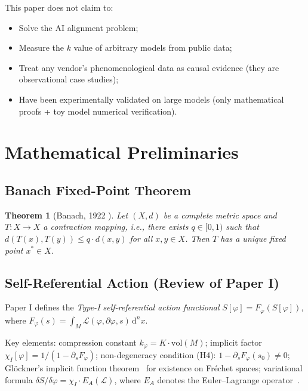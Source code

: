 \documentclass[12pt,a4paper]{article}
\newtheorem{theorem}{Theorem}[section]
\theoremstyle{definition}
\newcommand{\mL}{\mathcal{L}}
\newcommand{\vol}{\mathrm{vol}}
\newcommand{\diff}{\mathrm{d}}
\newcommand{\chiI}{\chi_I}
\newcommand{\EA}{E_A}
\newcommand{\dVol}{\,\diff^n x}
\begin{document}
This paper does not claim to:
\begin{itemize}[leftmargin=*]
\item Solve the AI alignment problem;
\item Measure the $k$ value of arbitrary models from public data;
\item Treat any vendor's phenomenological data as causal evidence (they are observational case studies);
\item Have been experimentally validated on large models (only mathematical proofs + toy model numerical verification).
\end{itemize}

\section{Mathematical Preliminaries}
\label{sec:prelim}

\subsection{Banach Fixed-Point Theorem}

\begin{theorem}[Banach, 1922 {\cite{Banach1922}}]
\label{thm:banach}
Let $(X, d)$ be a complete metric space and $T: X \to X$ a contraction mapping, i.e., there exists $q \in [0, 1)$ such that $d(T(x), T(y)) \leq q \cdot d(x, y)$ for all $x, y \in X$. Then $T$ has a unique fixed point $x^* \in X$.
\end{theorem}

\subsection{Self-Referential Action (Review of Paper I)}

Paper I defines the \emph{Type-I self-referential action functional} $S[\varphi] = F_\varphi(S[\varphi])$, where $F_\varphi(s) = \int_M \mL(\varphi, \partial\varphi, s) \dVol$.

Key elements: compression constant $k_\varphi = K \cdot \vol(M)$; implicit factor $\chiI[\varphi] = 1/(1 - \partial_s F_\varphi)$; non-degeneracy condition (H4): $1 - \partial_s F_\varphi(s_0) \neq 0$; Gl\"ockner's implicit function theorem~\cite{Glockner2006} for existence on Fr\'echet spaces; variational formula $\delta S / \delta\varphi = \chiI \cdot \EA(\mL)$, where $\EA$ denotes the Euler--Lagrange operator~\cite{Olver1993}.
\end{document}
